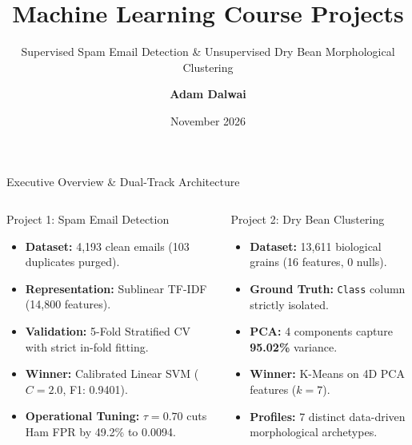 \documentclass[aspectratio=169,10pt]{beamer}
\title[\textbf{ML Course Projects}]{Machine Learning Course Projects}
\subtitle{Supervised Spam Email Detection \& Unsupervised Dry Bean Morphological Clustering}
\author[A. Dalwai]{\textbf{Adam Dalwai}}
\institute[CS Dept]{Department of Computer Science}
\date[Nov 2026]{November 2026}
\begin{document}
\frame{\titlepage}

\begin{frame}{Executive Overview \& Dual-Track Architecture}
\begin{columns}
\begin{block}{Project 1: Spam Email Detection}
\begin{itemize}
  \item \textbf{Dataset:} 4,193 clean emails (103 duplicates purged).
  \item \textbf{Representation:} Sublinear TF-IDF (14,800 features).
  \item \textbf{Validation:} 5-Fold Stratified CV with strict in-fold fitting.
  \item \textbf{Winner:} Calibrated Linear SVM ($C=2.0$, F1: 0.9401).
  \item \textbf{Operational Tuning:} $\tau=0.70$ cuts Ham FPR by 49.2\% to 0.0094.
\end{itemize}
\end{block}
\begin{block}{Project 2: Dry Bean Clustering}
\begin{itemize}
  \item \textbf{Dataset:} 13,611 biological grains (16 features, 0 nulls).
  \item \textbf{Ground Truth:} \texttt{Class} column strictly isolated.
  \item \textbf{PCA:} 4 components capture \textbf{95.02\%} variance.
  \item \textbf{Winner:} K-Means on 4D PCA features ($k=7$).
  \item \textbf{Profiles:} 7 distinct data-driven morphological archetypes.
\end{itemize}
\end{block}
\end{columns}
\end{frame}
\end{document}
